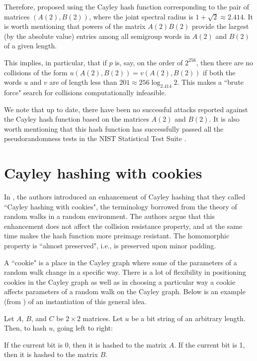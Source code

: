 \documentclass{lmsedition}
\begin{document}
\begin{twoblock}
Therefore, \cite{BSV} proposed using the Cayley hash function corresponding to the pair of matrices $(A(2), B(2))$, where the joint spectral radius is $1+\sqrt{2} \approx 2.414$. 
It is worth mentioning that powers of the matrix $A(2)B(2)$ provide the largest (by the absolute value) entries among all semigroup words in $A(2)$ and $B(2)$ of a given length.

This implies, in particular, that if $p$ is, say, on the order of $2^{256}$,  then there
are no collisions of the form  $u(A(2), B(2)) = v(A(2), B(2))$ if both the
words $u$ and  $v$ are of length less than $201 \approx  256 \log_{2.414}2$. This makes a ``brute force" search for collisions computationally infeasible. 


We note that up to date, there have been no successful attacks reported against the Cayley hash function based on the matrices $A(2)$ and $B(2)$. It is also worth mentioning that this hash function has successfully passed all the
pseudorandomness tests in the NIST Statistical Test Suite \cite{NIST}.



\section*{Cayley hashing with cookies}\label{cookies} 


In \cite{cookies}, the authors introduced an enhancement of Cayley hashing that they called ``Cayley hashing with cookies", the terminology borrowed from the theory of random walks in a random environment. The authors argue that this enhancement does not affect the collision resistance property, and at the same time makes the hash function more preimage resistant. The homomorphic property is ``almost preserved", i.e., is preserved upon minor padding.

A ``cookie" is a place in the Cayley graph where some of the parameters of a random walk change in a specific way. There is a lot of flexibility in positioning cookies in the Cayley graph as well as in choosing a particular way a cookie affects parameters of a random walk on the Cayley graph. Below is an example (from \cite{cookies}) of an instantiation of this general idea.

Let $A$, $B$, and $C$ be $2 \times 2$ matrices. Let $u$ be a bit string of an arbitrary length. Then, to hash $u$, going left to right:

\medskip

 If the current bit is 0, then it is hashed to the matrix $A$.
If the current bit is 1, then it is hashed to the matrix $B$. %


\end{twoblock}
\end{document}
